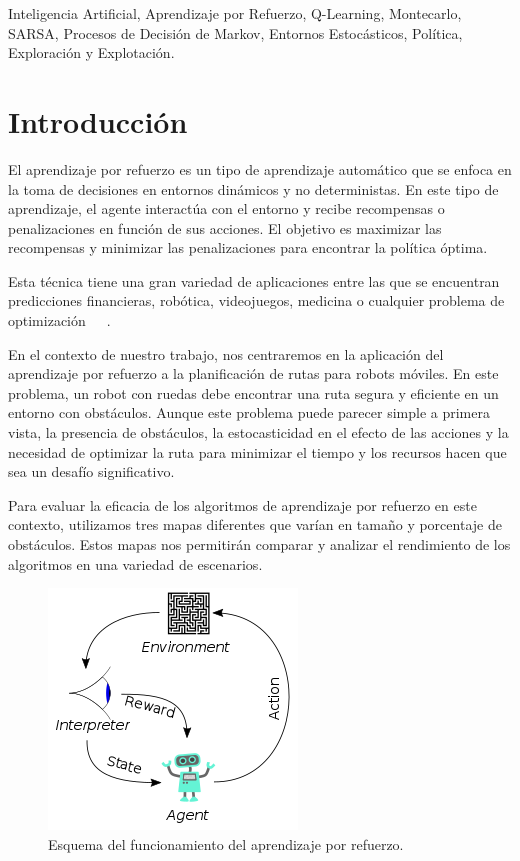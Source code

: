 \documentclass[conference,a4paper]{IEEEtran}
\begin{document}
\begin{IEEEkeywords}
  Inteligencia Artificial, Aprendizaje por Refuerzo, Q-Learning, Montecarlo, SARSA, Procesos de Decisión de Markov, Entornos Estocásticos,
  Política, Exploración y Explotación.
\end{IEEEkeywords}


\section{Introducción}

El aprendizaje por refuerzo es un tipo de aprendizaje automático que se enfoca en la toma de decisiones en entornos dinámicos y no deterministas. 
En este tipo de aprendizaje, el agente interactúa con el entorno y recibe recompensas o penalizaciones en función de sus acciones.
El objetivo es maximizar las recompensas y minimizar las penalizaciones para encontrar la política óptima.\newline

Esta técnica tiene una gran variedad de aplicaciones entre las que se encuentran predicciones financieras, robótica, 
videojuegos, medicina o cualquier problema de optimización~\cite{b2}~\cite{b3}~\cite{b6}.\newline

En el contexto de nuestro trabajo, nos centraremos en la aplicación del aprendizaje por refuerzo a la planificación de rutas para robots móviles. En este problema, un robot con ruedas debe encontrar una ruta segura y eficiente en un entorno con obstáculos. Aunque este problema puede parecer simple a primera vista, la presencia de obstáculos, la estocasticidad en el efecto de las acciones 
y la necesidad de optimizar la ruta para minimizar el tiempo y los recursos hacen que sea un desafío significativo.\newline

Para evaluar la eficacia de los algoritmos de aprendizaje por refuerzo en este contexto, utilizamos tres mapas diferentes que varían en tamaño y porcentaje de obstáculos. Estos mapas nos permitirán comparar y analizar el rendimiento de los algoritmos en una variedad de escenarios.

\begin{figure}[h]
  \centering
  \includegraphics{Reinforcement_learning_diagram.png}
  \caption{Esquema del funcionamiento del aprendizaje por refuerzo.}
  \label{fig:Reinforcement_learning_diagram}
\end{figure}
\end{document}
